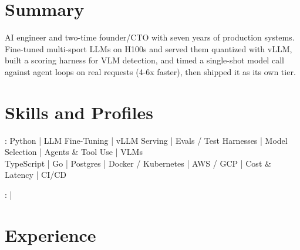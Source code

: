 \documentclass[print]{jack-resume}
\begin{document}
\pagecolor{darkmodeBackground}


\begin{minipage}[t][1cm][t]{.03\textwidth}
    \hfill
\end{minipage}

\section{Summary}
AI engineer and two-time founder/CTO with seven years of production systems. Fine-tuned multi-sport LLMs on H100s and served them quantized with vLLM, built a scoring harness for VLM detection, and timed a single-shot model call against agent loops on real requests (4-6x faster), then shipped it as its own tier.
\sectionsep

\section{Skills and Profiles}
:
Python \hfill | \hfill
LLM Fine-Tuning \hfill | \hfill
vLLM Serving \hfill | \hfill
Evals / Test Harnesses \hfill | \hfill
Model Selection \hfill | \hfill
Agents \& Tool Use \hfill | \hfill
VLMs \\
\hspace{1.0cm} TypeScript \hfill | \hfill
Go \hfill | \hfill
Postgres \hfill | \hfill
Docker / Kubernetes \hfill | \hfill
AWS / GCP \hfill | \hfill
Cost \& Latency \hfill | \hfill
CI/CD \\

\raggedright{
    :
      \href{https://www.linkedin.com/in/jack-sturtevant/}{ \ExternalLink} |
     \href{https://github.com/jacksturt}{ \ExternalLink}}

\section{Experience}
\end{document}
